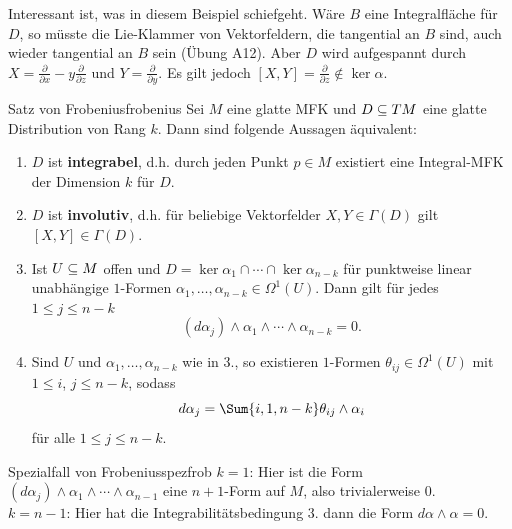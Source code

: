 Interessant ist, was in diesem Beispiel schiefgeht. Wäre $B$ eine Integralfläche für $D$, so müsste die Lie-Klammer von Vektorfeldern, die tangential an $B$ sind, auch wieder tangential an $B$ sein (Übung A12). Aber $D$ wird aufgespannt durch $X = \frac{\partial}{\partial x} - y \frac{\partial}{\partial z}$ und $Y = \frac{\partial}{\partial y}$. Es gilt jedoch $[X,Y] = \frac{\partial}{\partial z} \notin \ker \alpha$.
\begin{theorem}{Satz von Frobenius}{frobenius}
Sei $M$ eine glatte MFK und $D \subseteq TM$ eine glatte Distribution von Rang $k$. Dann sind folgende Aussagen äquivalent:
\begin{enumerate}
\item $D$ ist \textbf{integrabel}, d.h. durch jeden Punkt $p \in M$ existiert eine Integral-MFK der Dimension $k$ für $D$.
\item $D$ ist \textbf{involutiv}, d.h. für beliebige Vektorfelder $X, Y \in \Gamma (D)$ gilt $[X, Y] \in \Gamma (D)$.
\item Ist $U \subseteq M$ offen und $D = \ker \alpha_1 \cap \cdots \cap \ker \alpha_{n-k}$ für punktweise linear unabhängige $1$-Formen $\alpha_1, \dots, \alpha_{n-k} \in \Omega^1(U)$. Dann gilt für jedes $1 \leq j \leq n-k$
\begin{equation}
(d \alpha_j)\wedge \alpha_1 \wedge \cdots \wedge \alpha_{n-k} = 0.
\end{equation}
\item Sind $U$ und $\alpha_1, \dots, \alpha_{n-k}$ wie in $3.$, so existieren $1$-Formen $\theta_{ij} \in \Omega^1 (U)$ mit $1 \leq i$, $j \leq n-k$, sodass
\begin{equation}
d \alpha_j = \Sum{i, 1, n-k} \theta_{ij} \wedge \alpha_i
\end{equation}
für alle $1 \leq j \leq n-k$.
\end{enumerate}
\end{theorem}
\begin{korollar}{Spezialfall von Frobenius}{spezfrob}
$k=1$: Hier ist die Form $(d \alpha_j) \wedge \alpha_1 \wedge \cdots \wedge \alpha_{n-1}$ eine $n+1$-Form auf $M$, also trivialerweise $0$.\\
$k=n-1$: Hier hat die Integrabilitätsbedingung $3.$ dann die Form $d\alpha \wedge \alpha = 0$.
\end{korollar}
